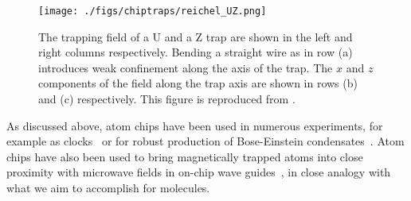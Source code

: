 
\begin{figure}
  \centering
  \texttt{[image: ./figs/chiptraps/reichel\_UZ.png]}
  \caption{
  The trapping field of a U and a Z trap are shown in the left and right
  columns respectively. Bending a straight wire as in row (a) introduces weak
  confinement along the axis of the trap.  The $x$ and $z$ components of the
  field along the trap axis are shown in rows (b) and (c) respectively. This
  figure is reproduced from . 
  }
  \label{intro:fig:reichel_UZ}
\end{figure}

As discussed above, atom chips have been used in numerous experiments, for
example as clocks~\cite{RAMIREZMARTINEZ2011247} or for robust production of
Bose-Einstein condensates~\cite{Ott2001}. Atom chips have also been used to
bring magnetically trapped atoms into close proximity with microwave fields in
on-chip wave guides~\cite{Treutlein2008}, in close analogy with what we aim to
accomplish for molecules. 
